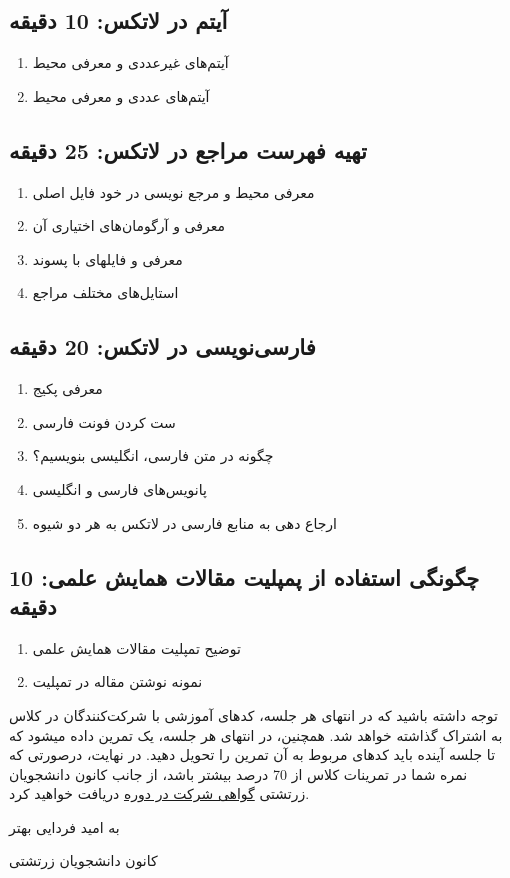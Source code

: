 \documentclass{article}
\begin{document}
\subsection*{آیتم در لاتکس: 10 دقیقه}
\begin{enumerate}
\item آیتم‌های غیرعددی و معرفی محیط 
\item آیتم‌های عددی و معرفی محیط 
\end{enumerate}
\subsection*{تهیه فهرست مراجع در لاتکس: 25 دقیقه}
\begin{enumerate}
\item معرفی محیط  و مرجع نویسی در خود فایل اصلی
\item معرفی  و آرگومان‌های اختیاری آن
\item معرفی  و فایلهای با پسوند 
\item استایل‌های مختلف مراجع
\end{enumerate}
\subsection*{فارسی‌نویسی در لاتکس: 20 دقیقه}
\begin{enumerate}
\item معرفی پکیج 
\item ست کردن فونت‌ فارسی
\item چگونه در متن فارسی، انگلیسی بنویسیم؟
\item پانویس‌های فارسی و انگلیسی
\item ارجاع دهی به منابع فارسی در لاتکس به هر دو شیوه
\end{enumerate}
\subsection*{چگونگی استفاده از پمپلیت مقالات همایش علمی: 10 دقیقه}
\begin{enumerate}
\item  توضیح تمپلیت مقالات همایش علمی
\item نمونه نوشتن مقاله در تمپلیت
\end{enumerate}



توجه داشته باشید که در انتهای هر جلسه، کدهای آموزشی با شرکت‌کنندگان در کلاس به اشتراک گذاشته خواهد شد. همچنین، در انتهای هر جلسه، یک تمرین داده میشود که تا جلسه آینده باید کدهای مربوط به آن تمرین را تحویل دهید. در نهایت، درصورتی که نمره شما در تمرینات کلاس از 70 درصد بیشتر باشد، از جانب کانون دانشجویان زرتشتی \underline{گواهی شرکت در دوره} دریافت خواهید کرد.

\vspace{5cm}
\begin{center}
به امید فردایی بهتر

کانون دانشجویان زرتشتی
\end{center}
\end{document}

